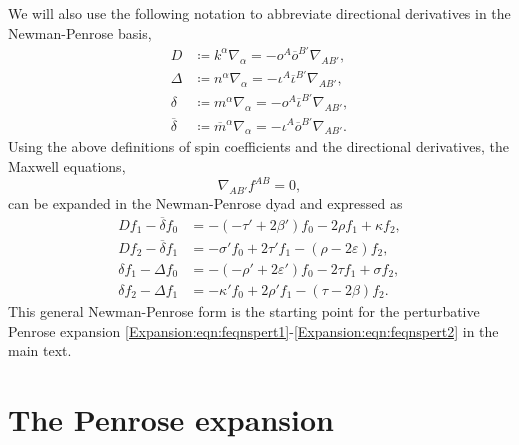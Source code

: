 	We will also use the following notation to abbreviate directional derivatives in the Newman-Penrose basis,
	\begin{subequations}\label{Expansion:eqn:directionalderivatives} 
		\begin{align} 
		D &\coloneqq k^{\alpha} \nabla_{\alpha} = -o^{A} \overline{o}^{B'} \nabla_{AB'}, \\
		\Delta &\coloneqq n^{\alpha} \nabla_{\alpha} = - \iota^{A} \overline{\iota}^{B'} \nabla_{AB'}, \\
		\delta &\coloneqq m^{\alpha} \nabla_{\alpha} = -o^{A} \overline{\iota}^{B'} \nabla_{AB'}, \\
		\overline{\delta} &\coloneqq \overline{m}^{\alpha} \nabla_{\alpha} = -\iota^{A} \overline{o}^{B'} \nabla_{AB'}.
		\end{align}
	\end{subequations}
	Using the above definitions of spin coefficients and the directional derivatives, the Maxwell equations,
	\begin{equation}  
	\nabla_{AB'} f^{AB} = 0,
	\end{equation}
	can be expanded in the Newman-Penrose dyad and expressed as
	\begin{align}
	D f_{1} - \overline{\delta} f_{0} &= -\left(-\tau' + 2 \beta'\right) f_{0} - 2 \rho f_{1} + \kappa f_{2}, \label{Expansion:eqn:app:maxwell1}\\
	D f_{2} - \overline{\delta} f_{1} &= -\sigma' f_{0} + 2 \tau' f_{1} - \left(\rho - 2 \varepsilon\right) f_{2}, \\
	\delta f_{1} - \Delta f_{0} &= -\left(-\rho' + 2 \varepsilon' \right) f_{0} - 2 \tau f_{1} + \sigma f_{2}, \\
	\delta f_{2} - \Delta f_{1} &= -\kappa' f_{0}  + 2 \rho' f_{1} - \left(\tau - 2 \beta\right) f_{2}. \label{Expansion:eqn:app:maxwell4}
	\end{align}
	This general Newman-Penrose form is the starting point for the perturbative Penrose expansion \eqref{Expansion:eqn:feqnspert1}-\eqref{Expansion:eqn:feqnspert2} in the main text.
	
	\chapter{The Penrose expansion}\label{Expansion:app:Penroseexpansion}
	
